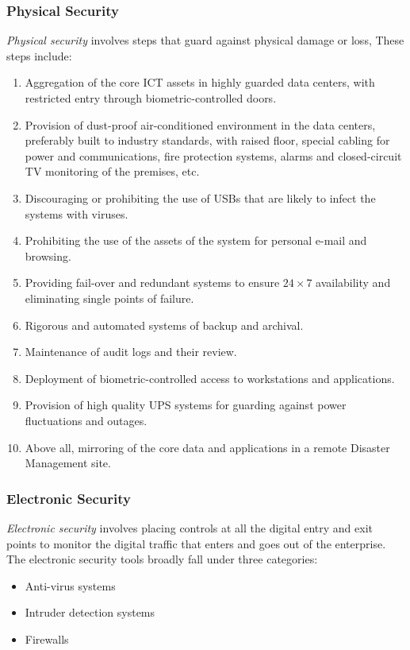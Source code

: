 \subsubsection{Physical Security}
 \textit{Physical security} involves steps that guard against physical damage or loss, These steps include:
 
\begin{enumerate}
	\item Aggregation of the core ICT assets in highly guarded data centers, with restricted entry through biometric-controlled doors.
	
	\item Provision of dust-proof air-conditioned environment in the data centers,
	preferably built to industry standards, with raised floor, special cabling for power and communications, fire protection systems, alarms and closed-circuit TV
	monitoring of the premises, etc.
	
	\item Discouraging or prohibiting the use of USBs that are likely to infect the
	systems with viruses.
	
	\item Prohibiting the use of the assets of the system for personal e-mail and browsing.
	
	\item Providing fail-over and redundant systems to ensure $ 24 \times 7 $ availability and eliminating single points of failure.
	
	\item Rigorous and automated systems of backup and archival.
	
	\item Maintenance of audit logs and their review.
	
	\item Deployment of biometric-controlled access to workstations and applications.
	
	\item Provision of high quality UPS systems for guarding against power fluctuations and outages.
	
	\item Above all, mirroring of the core data and applications in a remote Disaster
	Management site.
\end{enumerate}
 
\subsubsection{Electronic Security}
 \textit{Electronic security} involves placing controls at all the digital entry and exit points to monitor the digital traffic that enters and goes out of the enterprise. The electronic security tools broadly fall under three categories:
 \begin{multicols}{2}
	\begin{itemize}
		\item Anti-virus systems
		\item Intruder detection systems
		\item Firewalls
	\end{itemize} 
 \end{multicols}


